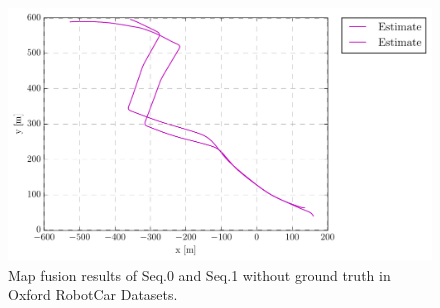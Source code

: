 \begin{figure}[H]
	\centering
	\includegraphics[width=5in]{Chapter4/robotcar/plots/trajectory_top_est_sim3_-1.pdf}
	\caption{Map fusion results of Seq.0 and Seq.1 without ground truth in Oxford RobotCar Datasets.}
	\label{fig:robotcarmfresult} 
\end{figure}


\newpage
